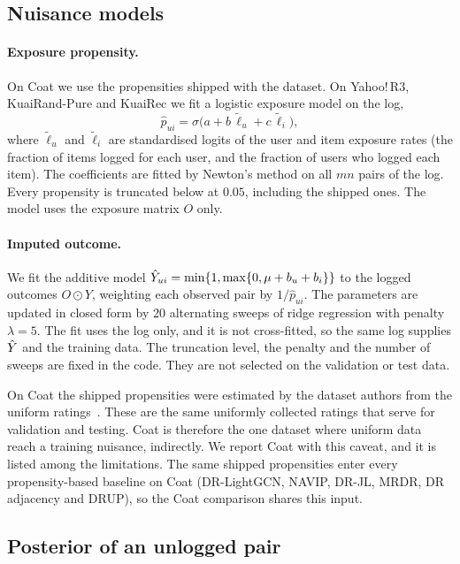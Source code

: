 \subsection{Nuisance models}\label{sec:nuisance}

\paragraph{Exposure propensity.}
On Coat we use the propensities shipped with the dataset. On Yahoo!\,R3, KuaiRand-Pure and
KuaiRec we fit a logistic exposure model on the log,
\begin{equation*}
\hat p_{ui}=\sigma\bigl(a+b\,\tilde\ell_u+c\,\tilde\ell_i\bigr),
\end{equation*}
where $\tilde\ell_u$ and $\tilde\ell_i$ are standardised logits of the user and item exposure
rates (the fraction of items logged for each user, and the fraction of users who logged each
item). The coefficients are fitted by Newton's method on all $mn$ pairs of the log. Every
propensity is truncated below at $0.05$, including the shipped ones. The model uses the
exposure matrix $O$ only.

\paragraph{Imputed outcome.}
We fit the additive model $\hat Y_{ui}=\min\{1,\max\{0,\mu+b_u+b_i\}\}$ to the logged outcomes
$O\odot Y$, weighting each observed pair by $1/\hat p_{ui}$. The parameters are updated in closed
form by 20 alternating sweeps of ridge regression with penalty $\lambda=5$. The fit uses the
log only, and it is not cross-fitted, so the same log supplies $\hat Y$ and the training data.
The truncation level, the penalty and the number of sweeps are fixed in the code. They are not
selected on the validation or test data.

On Coat the shipped propensities were estimated by the dataset authors from the uniform
ratings~\citep{schnabel2016}. These are the same uniformly collected ratings that serve for
validation and testing. Coat is therefore the one dataset where uniform data reach a training
nuisance, indirectly. We report Coat with this caveat, and it is listed among the limitations.
The same shipped propensities enter every propensity-based baseline on Coat (DR-LightGCN, NAVIP, DR-JL, MRDR,
DR adjacency and DRUP), so the Coat comparison shares this input.

\subsection{Posterior of an unlogged pair}\label{sec:posterior}

